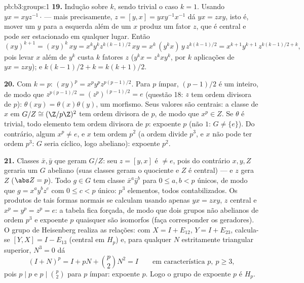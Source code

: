 \begin{solution}{pb:b3:groups:1}
\textbf{19.} Indução sobre $k$, sendo trivial o caso $k = 1$.
Usando $yx = xyz^{-1}\cdot$\,--- mais precisamente, $z = [y, x] =
yxy^{-1}x^{-1}$ dá $yx = zxy$, isto é, mover um
$y$ para a esquerda além de um $x$ produz um fator $z$, que é
central e pode ser estacionado em qualquer lugar. Então
\[
(xy)^{k+1} = (xy)^k\,xy = x^ky^kz^{k(k-1)/2}\,xy
= x^k\,(y^kx)\,y\,z^{k(k-1)/2}
= x^{k+1}y^{k+1}\,z^{k(k-1)/2 + k},
\]
pois levar $x$ além de $y^k$ custa $k$ fatores $z$ ($y^kx =
z^kxy^k$,
por $k$ aplicações de $yx = zxy$); e $k(k-1)/2 + k
= k(k+1)/2$.

\textbf{20.} Com $k = p$: $(xy)^p = x^py^pz^{p(p-1)/2}$. Para $p$ ímpar, $(p-1)/2$ é um
inteiro, de modo que $z^{p(p-1)/2} =
(z^p)^{(p-1)/2} = e$ (questão 18: $z$ tem ordem divisora de
$p$): $\theta(xy) = \theta(x)\theta(y)$, um morfismo. Seus valores são centrais: a classe de
$x$ em $G/Z \cong (\Z/p\Z)^2$ tem ordem divisora de $p$, de modo que $x^p \in Z$. Se
$\theta$ é trivial, todo elemento tem ordem divisora de $p$:
expoente $p$ (não $1$: $G \neq
\{e\}$). Do contrário, algum $x^p \neq e$, e
$x$ tem ordem $p^2$ (a ordem divide $p^3$, e $x$ não pode
ter ordem $p^3$: $G$ seria cíclico, logo abeliano): expoente
$p^2$.

\textbf{21.} Classes $\bar x, \bar y$ que geram $G/Z$: seu  $z = [y, x]$ é
$\neq e$, pois do contrário $x, y, Z$ geraria um $G$ abeliano (suas
classes geram o quociente e $Z$ é central) --- e $z$ gera
$Z$ ($\abs Z = p$). Todo $g \in G$ tem classe $\bar x^a\bar y^b$ para $0 \leq a, b <
p$ únicos, de modo
que $g = x^ay^bz^c$ com $0 \leq c < p$ único: $p^3$ elementos, todos contabilizados. Os
produtos de tais formas normais se calculam usando apenas $yx = zxy$, $z$
central e $x^p = y^p =
z^p = e$: a tabela fica forçada, de modo que dois grupos não
abelianos de ordem $p^3$ e expoente $p$ quaisquer são isomorfos
(faça corresponder os geradores). O grupo de Heisenberg realiza as
relações: com $X = I + E_{12}$, $Y = I + E_{23}$, calcula-se $[Y, X] = I -
E_{13}$ (central em $H_p$) e,
para qualquer $N$ estritamente triangular superior, $N^3 = 0$ dá
\[
(I + N)^p = I + pN + \binom p2N^2 = I
\qquad\text{em característica } p,\ p \geq 3,
\]
pois $p \mid p$ e $p \mid \binom p2$ para $p$ ímpar: expoente $p$. Logo o grupo de
expoente $p$ é $H_p$.


\end{solution}
